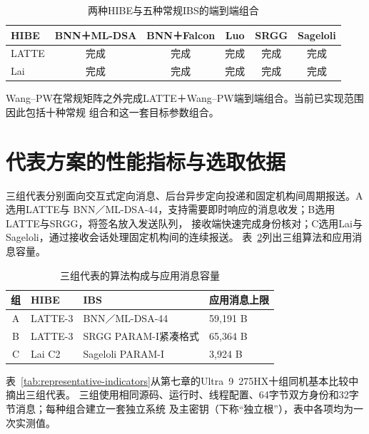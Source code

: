 \begin{table}[H]
\centering\small
\caption{两种HIBE与五种常规IBS的端到端组合}
\label{tab:implemented-matrix}
\begin{tabular}{@{}lccccc@{}}
\toprule
\rowcolor{black!8} HIBE & BNN＋ML-DSA & BNN＋Falcon & Luo & SRGG & Sageloli \\
\midrule
LATTE & 完成 & 完成 & 完成 & 完成 & 完成 \\
Lai & 完成 & 完成 & 完成 & 完成 & 完成 \\
\bottomrule
\end{tabular}
\end{table}

Wang--PW在常规矩阵之外完成LATTE＋Wang--PW端到端组合。当前已实现范围因此包括十种常规
组合和这一套目标参数组合。

\section{代表方案的性能指标与选取依据}

三组代表分别面向交互式定向消息、后台异步定向投递和固定机构间周期报送。A选用LATTE与
BNN／ML-DSA-44，支持需要即时响应的消息收发；B选用LATTE与SRGG，将签名放入发送队列，
接收端快速完成身份核对；C选用Lai与Sageloli，通过接收会话处理固定机构间的连续报送。
表~\ref{tab:representatives}列出三组算法和应用消息容量。

\begin{table}[H]
\centering\small
\caption{三组代表的算法构成与应用消息容量}
\label{tab:representatives}
\begin{tabularx}{\textwidth}{@{}cp{}Xp{}@{}}
\toprule
\rowcolor{black!8} 组 & HIBE & IBS & 应用消息上限 \\
\midrule
A & LATTE-3 & BNN／ML-DSA-44 & 59,191 B \\
B & LATTE-3 & SRGG PARAM-I紧凑格式 & 65,364 B \\
C & Lai C2 & Sageloli PARAM-I & 3,924 B \\
\bottomrule
\end{tabularx}

\end{table}

表~\ref{tab:representative-indicators}从第七章的Ultra~9~275HX十组同机基本比较中摘出三组代表。
三组使用相同源码、运行时、线程配置、64字节双方身份和32字节消息；每种组合建立一套独立系统
及主密钥（下称“独立根”），表中各项均为一次实测值。

